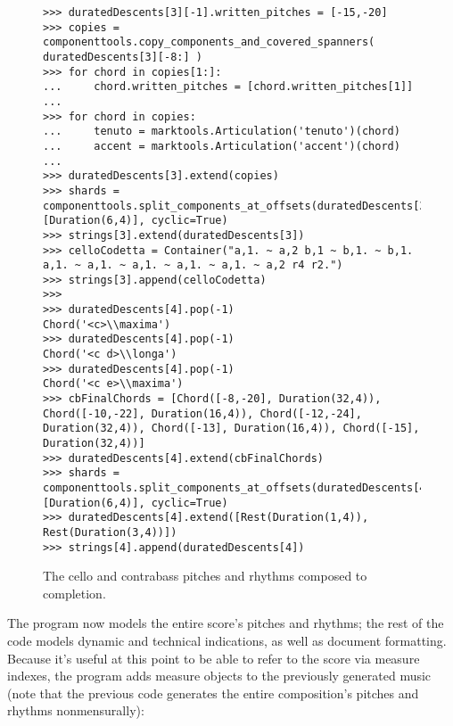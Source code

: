 \begin{figure}[H] 
\begin{lstlisting}[basicstyle=\scriptsize\ttfamily, breaklines=True, tabsize=4, showtabs=false, showspaces=false]
>>> duratedDescents[3][-1].written_pitches = [-15,-20]
>>> copies = componenttools.copy_components_and_covered_spanners( duratedDescents[3][-8:] )
>>> for chord in copies[1:]:
... 	chord.written_pitches = [chord.written_pitches[1]]
... 
>>> for chord in copies:
... 	tenuto = marktools.Articulation('tenuto')(chord)
... 	accent = marktools.Articulation('accent')(chord)
... 
>>> duratedDescents[3].extend(copies)
>>> shards = componenttools.split_components_at_offsets(duratedDescents[3].leaves, [Duration(6,4)], cyclic=True)
>>> strings[3].extend(duratedDescents[3])
>>> celloCodetta = Container("a,1. ~ a,2 b,1 ~ b,1. ~ b,1. a,1. ~ a,1. ~ a,1. ~ a,1. ~ a,1. ~ a,2 r4 r2.")
>>> strings[3].append(celloCodetta)
>>> 
>>> duratedDescents[4].pop(-1)
Chord('<c>\\maxima')
>>> duratedDescents[4].pop(-1)
Chord('<c d>\\longa')
>>> duratedDescents[4].pop(-1)
Chord('<c e>\\maxima')
>>> cbFinalChords = [Chord([-8,-20], Duration(32,4)), Chord([-10,-22], Duration(16,4)), Chord([-12,-24], Duration(32,4)), Chord([-13], Duration(16,4)), Chord([-15], Duration(32,4))]
>>> duratedDescents[4].extend(cbFinalChords)
>>> shards = componenttools.split_components_at_offsets(duratedDescents[4].leaves, [Duration(6,4)], cyclic=True)
>>> duratedDescents[4].extend([Rest(Duration(1,4)), Rest(Duration(3,4))])
>>> strings[4].append(duratedDescents[4])\end{lstlisting}

\caption{The cello and contrabass pitches and rhythms composed to completion. } 
\end{figure}

The program now models the entire score's pitches and rhythms; the rest of the code models dynamic and technical indications, as well as document formatting. Because it's useful at this point to be able to refer to the score via measure indexes, the program adds measure objects to the previously generated music (note that the previous code generates the entire composition's pitches and rhythms nonmensurally):

